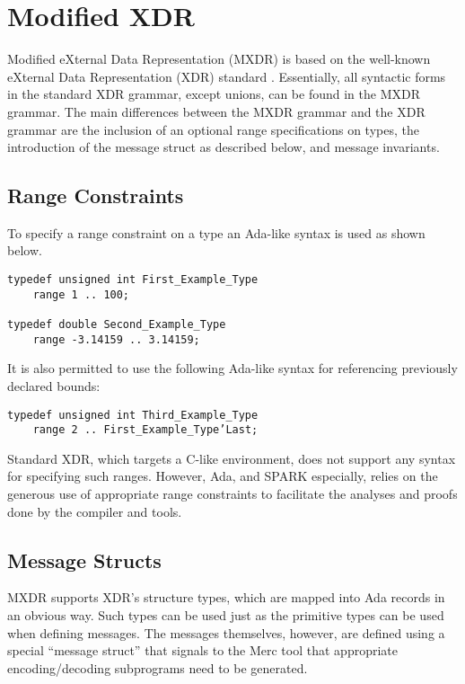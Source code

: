 
\section{Modified XDR}
\label{sec:mxdr}

Modified eXternal Data Representation (MXDR) is based on the well-known eXternal Data
Representation (XDR) standard \cite{rfc-4506}. Essentially, all syntactic forms in the standard
XDR grammar, except unions, can be found in the MXDR grammar. The main differences between the
MXDR grammar and the XDR grammar are the inclusion of an optional range specifications on types,
the introduction of the message struct as described below, and message invariants.


\subsection{Range Constraints}

To specify a range constraint on a type an Ada-like syntax is used as shown below.

\begin{Verbatim}
typedef unsigned int First_Example_Type
    range 1 .. 100;

typedef double Second_Example_Type
    range -3.14159 .. 3.14159;
\end{Verbatim}

It is also permitted to use the following Ada-like syntax for referencing previously declared
bounds:

\begin{Verbatim}
typedef unsigned int Third_Example_Type
    range 2 .. First_Example_Type’Last;
\end{Verbatim}

Standard XDR, which targets a C-like environment, does not support any syntax for specifying
such ranges. However, Ada, and SPARK especially, relies on the generous use of appropriate range
constraints to facilitate the analyses and proofs done by the compiler and tools.

\subsection{Message Structs}

MXDR supports XDR's structure types, which are mapped into Ada records in an obvious way. Such
types can be used just as the primitive types can be used when defining messages. The messages
themselves, however, are defined using a special ``message struct'' that signals to the Merc
tool that appropriate encoding/decoding subprograms need to be generated.

